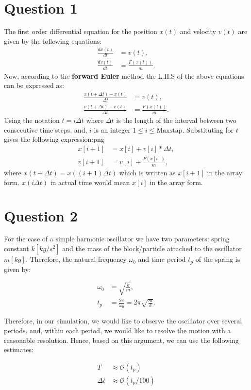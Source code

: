 \documentclass[10pt]{article}
\begin{document}
\section*{Question 1}
The first order differential equation for the position $x(t)$ and velocity $v(t)$ are given by the following equations:
\begin{align}
\frac{dx(t)}{dt} &= v(t), \\
\frac{dv(t)}{dt} &= \frac{F(x(t))}{m}.
\end{align}
%
Now, according to the \textbf{forward Euler} method the L.H.S of the above equations can be expressed  as:
\begin{align*}
\frac{x(t + \Delta t) - x(t)}{\Delta t} &= v(t), \\
\frac{v(t + \Delta t) - v(t)}{\Delta t} &= \frac{F(x(t))}{m}.
\end{align*}
%
Using the notation $t=i\Delta t$ where $\Delta t$ is the length of the interval between two consecutive time steps, and, $i$ is an integer $1\leq i \leq \mathrm{Maxstap}$. Substituting for $t$ gives the following expression:png
%
\begin{align*}
x[i+1] &= x[i] + v[i]*\Delta t, \\
v[i+1] &= v[i] + \frac{F(x[i])}{m},
\end{align*}
%
where $x(t+\Delta t) = x((i+1)\Delta t)$ which is written as $x[i+1]$ in the array form. $x(i\Delta t)$ in actual time would mean $x[i]$ in the array form.

\section*{Question 2}
For the case of a simple harmonic oscillator we have two parameters: spring constant $k [kg/s^2]$ and the mass of the block/particle attached to the oscillator $m [kg]$. Therefore, the natural frequency $\omega_{0}$ and time period $t_{p}$ of the spring is given by:

\begin{align}
\omega_{0} &= \sqrt{\frac{k}{m}},\\
t_{p} &= \frac{2\pi}{\omega_{0}}=2\pi \sqrt{\frac{m}{k}}.
\end{align}

Therefore, in our simulation, we would like to observe the oscillator over several periods, and, within each period, we would like to resolve the motion with a reasonable resolution. Hence, based on this argument, we can use the following estimates:

\begin{align*}
T &\approx \mathcal{O}(t_{p}) \\
\Delta t &\approx \mathcal{O}(t_{p}/100) \\
\end{align*}
\end{document}
